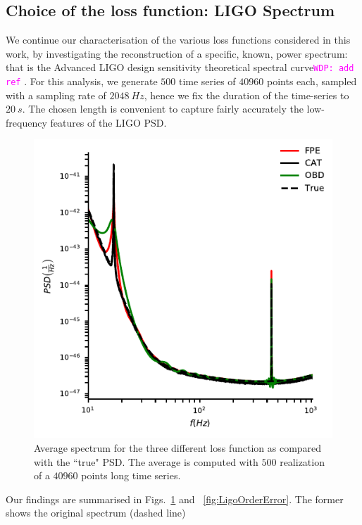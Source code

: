 \documentclass[twocolumn,showpacs,preprintnumbers,nofootinbib,prd,
superscriptaddress,10pt]{revtex4-1}
\newcommand{\wdp}[1]{{\textcolor{magenta}{\texttt{WDP: #1}} }}
\begin{document}
\subsection{Choice of the loss function: LIGO Spectrum} \label{sec:LIGO_validation}
We continue our characterisation of the various loss functions considered in this work, by investigating the 
reconstruction of a specific, known, power spectrum: that is the Advanced LIGO design sensitivity theoretical spectral curve\wdp{add ref}.
For this analysis, we generate $500$ time series of $40960$ points each, sampled with a sampling rate of $\SI{2048}{Hz}$, hence we fix the duration
of the time-series to $\SI{20}{s}$. The chosen length is convenient to capture fairly accurately the low-frequency features of the LIGO PSD.

\begin{figure}
    \centering
     \includegraphics[width = \linewidth]{Images/optimisers_comparison/ligo/compare_estimates.pdf}
      \caption{Average spectrum for the three different loss function as compared with the ``true" PSD. The average is computed with $500$ realization of a $40960$ points long time series.}
       \label{fig:ligospectrum}
\end{figure}
Our findings are summarised in Figs.~\ref{fig:ligospectrum} and ~\ref{fig:LigoOrderError}. The former shows the original spectrum (dashed line)
\end{document}
